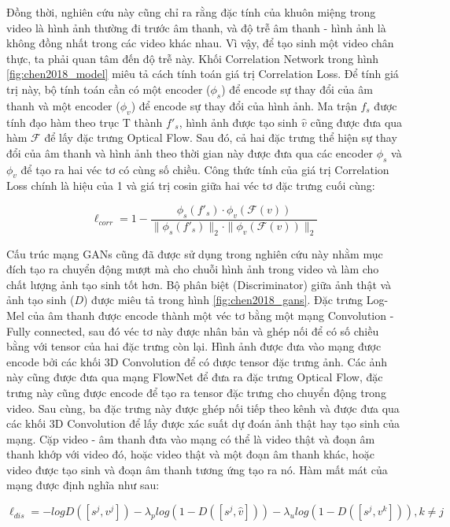Đồng thời, nghiên cứu này cũng chỉ ra rằng đặc tính của khuôn miệng trong video là hình ảnh thường đi trước âm thanh, và độ trễ âm thanh - hình ảnh là không đồng nhất trong các video khác nhau. Vì vậy, để tạo sinh một video chân thực, ta phải quan tâm đến độ trễ này. Khối Correlation Network trong hình \ref{fig:chen2018_model} miêu tả cách tính toán giá trị Correlation Loss. Để tính giá trị này, bộ tính toán cần có một encoder ($\phi_s$) để encode sự thay đổi của âm thanh và một encoder ($\phi_v$) để encode sự thay đổi của hình ảnh. Ma trận $f_s$ được tính đạo hàm theo trục T thành $f'_s$, hình ảnh được tạo sinh $\hat{v}$ cũng được đưa qua hàm $\mathcal{F}$ để lấy đặc trưng Optical Flow. Sau đó, cả hai đặc trưng thể hiện sự thay đổi của âm thanh và hình ảnh theo thời gian này được đưa qua các encoder $\phi_s$ và $\phi_v$ để tạo ra hai véc tơ có cùng số chiều. Công thức tính của giá trị Correlation Loss chính là hiệu của 1 và giá trị cosin giữa hai véc tơ đặc trưng cuối cùng:

\begin{equation}
    \ell_{corr} = 1 - \frac{\phi_s(f'_s)\cdot\phi_v(\mathcal{F}(v))}{\|\phi_s(f'_s)\|_2\cdot\|\phi_v(\mathcal{F}(v))\|_2}
    \label{eqn:chen2018_corr_loss}
\end{equation}


Cấu trúc mạng GANs cũng đã được sử dụng trong nghiên cứu này nhằm mục đích tạo ra chuyển động mượt mà cho chuỗi hình ảnh trong video và làm cho chất lượng ảnh tạo sinh tốt hơn. Bộ phân biệt (Discriminator) giữa ảnh thật và ảnh tạo sinh ($D$) được miêu tả trong hình \ref{fig:chen2018_gans}. Đặc trưng Log-Mel của âm thanh được encode thành một véc tơ bằng một mạng Convolution - Fully connected, sau đó véc tơ này được nhân bản và ghép nối để có số chiều bằng với tensor của hai đặc trưng còn lại. Hình ảnh được đưa vào mạng được encode bởi các khối 3D Convolution để có được tensor đặc trưng ảnh. Các ảnh này cũng được đưa qua mạng FlowNet để đưa ra đặc trưng Optical Flow, đặc trưng này cũng được encode để tạo ra tensor đặc trưng cho chuyển động trong video. Sau cùng, ba đặc trưng này được ghép nối tiếp theo kênh và được đưa qua các khối 3D Convolution để lấy được xác suất dự đoán ảnh thật hay tạo sinh của mạng. Cặp video - âm thanh đưa vào mạng có thể là video thật và đoạn âm thanh khớp với video đó, hoặc video thật và một đoạn âm thanh khác, hoặc video được tạo sinh và đoạn âm thanh tương ứng tạo ra nó. Hàm mất mát của mạng được định nghĩa như sau:

\begin{equation}
    \ell_{dis} = -logD([s^j, v^j]) - \lambda_plog(1 - D([s^j, \hat{v}])) - \lambda_ulog(1 - D([s^j, v^k])), k \ne j
\end{equation}


